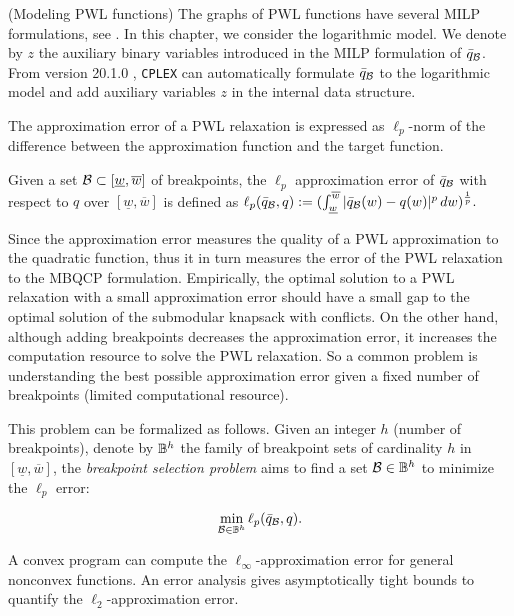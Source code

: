 \begin{remark}
(Modeling PWL functions) The graphs of PWL functions have several MILP formulations, see \cite{vielma2010}. In this chapter, we consider the logarithmic model. We denote by $z$ the auxiliary binary variables introduced in the MILP formulation of $\bar{q}_{\mathcal B}$. From version 20.1.0 \citep{cplexsos}, \texttt{CPLEX} can automatically formulate $\bar{q}_{\mathcal B}$ to the logarithmic model and add auxiliary variables $z$ in the internal data structure.
\end{remark}


The approximation error of a PWL relaxation is expressed as $\ell_p$-norm of the difference between the approximation function and the target function.
 

\begin{definition}
Given a set \(\mathcal B \subset [\underline{w}, \overline{w}]\) of breakpoints, the \(\ell_p\) approximation error of \(\bar{q}_{\mathcal B}\) with respect to \(q\) over \([\underline{w},\overline{w}]\) is defined as \(\ell_p(\bar{q}_{\mathcal B}, q) := (\int_{ \underline{w}}^{\overline{w}}|\bar{q}_{\mathcal B}(w) - q(w)|^p \,dw)^{\frac{1}{p}}. \)
\end{definition}

Since the approximation error measures the quality of a PWL approximation to the quadratic function, thus it in turn measures the error of the PWL relaxation to the MBQCP formulation. Empirically, the optimal solution to a PWL relaxation with a small approximation error should have a small gap to the optimal solution of the submodular knapsack with conflicts.  On the other hand, although adding breakpoints decreases the approximation error, it increases the computation resource to solve the PWL relaxation. So a common problem is understanding the best possible approximation error given a fixed number of breakpoints (limited computational resource).



This problem can be formalized as follows. Given an integer \(h\) (number of breakpoints), denote by \(\mathbb B^h\) the family of breakpoint sets of cardinality \(h\) in \([\underline{w}, \overline{w}]\), the \textit{breakpoint selection problem} aims to find a set \(\mathcal B \in \mathbb B^h\) to minimize the  \(\ell_p\) error:

\begin{equation}
\label{bsp}
    \min_{\mathcal B \in \mathbb B^h} \ell_p(\bar{q}_{\mathcal B}, q).
\end{equation}

 A convex program
\cite{geissler2012using} can compute the $\ell_\infty$-approximation error for general nonconvex functions.  An error analysis \cite{berjon2015optimal} gives asymptotically tight bounds to quantify the $\ell_2$-approximation error.


